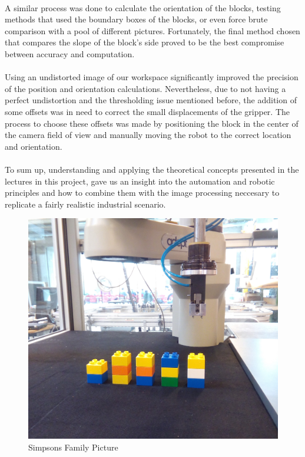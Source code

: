 \paragraph{} A similar process was done to calculate the orientation of the blocks, testing methods that used the boundary boxes of the blocks, or even force brute comparison with a pool of different pictures. Fortunately, the final method chosen that compares the slope of the block's side proved to be the best compromise between accuracy and computation.

\paragraph{} Using an undistorted image of our workspace significantly improved the precision of the position and orientation calculations. Nevertheless, due to not having a perfect undistortion and the thresholding issue mentioned before, the addition of some offsets was in need to correct the small displacements of the gripper. 
The process to choose these offsets was made by positioning the block in the center of the camera field of view and manually moving the robot to the correct location and orientation.

\paragraph{} To sum up, understanding and applying the theoretical concepts presented in the lectures in this project, gave us an insight into the automation and robotic principles and how to combine them with the image processing neccesary to replicate a fairly realistic industrial scenario.

\begin{figure}[H]
	\centering
	\includegraphics[scale=0.15]{figures/simpsons.jpg}
	\caption{Simpsons Family Picture}
\end{figure}